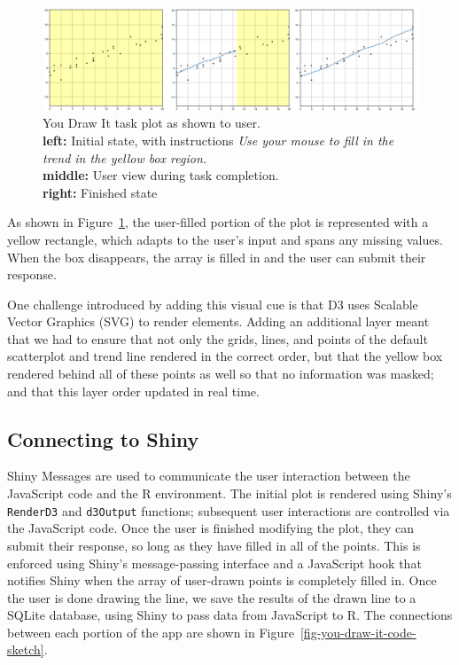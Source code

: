 \documentclass[
]{jds}
\begin{document}
\begin{figure}

{\centering \includegraphics{images/ydi-stimuli.png}

}

\caption{\label{fig-you-draw-it-task-plot}You Draw It task plot as shown
to user.\\
\textbf{left:} Initial state, with instructions \emph{Use your mouse to
fill in the trend in the yellow box region.}\\
\textbf{middle:} User view during task completion.\\
\textbf{right:} Finished state}

\end{figure}

As shown in Figure~\ref{fig-you-draw-it-task-plot}, the user-filled
portion of the plot is represented with a yellow rectangle, which adapts
to the user's input and spans any missing values. When the box
disappears, the array is filled in and the user can submit their
response.

One challenge introduced by adding this visual cue is that D3 uses
Scalable Vector Graphics (SVG) to render elements. Adding an additional
layer meant that we had to ensure that not only the grids, lines, and
points of the default scatterplot and trend line rendered in the correct
order, but that the yellow box rendered behind all of these points as
well so that no information was masked; and that this layer order
updated in real time.

\hypertarget{connecting-to-shiny}{%
\subsection{Connecting to Shiny}\label{connecting-to-shiny}}

Shiny Messages are used to communicate the user interaction between the
JavaScript code and the R environment. The initial plot is rendered
using Shiny's \texttt{RenderD3} and \texttt{d3Output} functions;
subsequent user interactions are controlled via the JavaScript code.
Once the user is finished modifying the plot, they can submit their
response, so long as they have filled in all of the points. This is
enforced using Shiny's message-passing interface and a JavaScript hook
that notifies Shiny when the array of user-drawn points is completely
filled in. Once the user is done drawing the line, we save the results
of the drawn line to a SQLite database, using Shiny to pass data from
JavaScript to R. The connections between each portion of the app are
shown in Figure~\ref{fig-you-draw-it-code-sketch}.
\end{document}
